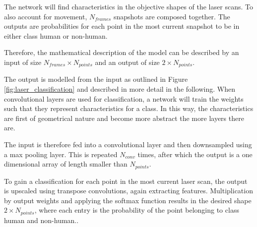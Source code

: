 The network will find characteristics in the objective shapes of the laser scans. To also account for movement, $N_{frames}$ snapshots are composed together.
The outputs are probabilities for each point in the most current snapshot to be in either class human or non-human.

Therefore, the mathematical description of the model can be described by an input of size $N_{frames} \times N_{points}$ and an output of size $2 \times N_{points}$.

The output is modelled from the input as outlined in Figure \ref{fig:laser_classification} and described in more detail in the following.
When convolutional layers are used for classification, a network will train the weights such that they represent characteristics for a class. In this way, the characteristics are first of geometrical nature and become more abstract the more layers there are.

The input is therefore fed into a convolutional layer and then downsampled using a max pooling layer. This is repeated $N_{conv}$ times, after which the output is a one dimensional array of length smaller than $N_{points}$.

To gain a classification for each point in the most current laser scan, the output is upscaled using transpose convolutions, again extracting features. Multiplication by output weights and applying the softmax function results in the desired shape $2 \times N_{points}$, where each entry is the probability of the point belonging to class human and non-human..